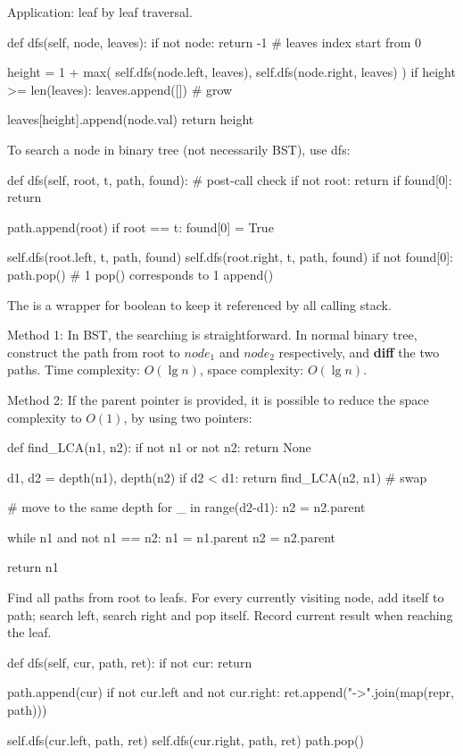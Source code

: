 Application: leaf by leaf traversal. 
\begin{python}
def dfs(self, node, leaves):
    if not node:
        return -1  # leaves index start from 0

    height = 1 + max(
        self.dfs(node.left, leaves), 
        self.dfs(node.right, leaves)
    )
    if height >= len(leaves):
        leaves.append([])  # grow

    leaves[height].append(node.val)
    return height
\end{python}
 To search a node in binary tree (not necessarily BST), use dfs:
\begin{python}
def dfs(self, root, t, path, found):
    # post-call check
    if not root: return        
    if found[0]: return 

    path.append(root)
    if root == t:
        found[0] = True

    self.dfs(root.left, t, path, found)
    self.dfs(root.right, t, path, found)
    if not found[0]:
        path.pop()  # 1 pop() corresponds to 1 append()
\end{python}
The  is a wrapper for boolean to keep it referenced by all calling stack. 

 Method 1: In BST, the searching is straightforward. In normal binary tree, construct the path from root to $node_1$ and $node_2$ respectively, and \textbf{diff} the two paths. Time complexity: $O(\lg n)$, space complexity: $O(\lg n)$. 

Method 2: If the parent pointer is provided, it is possible to reduce the space complexity to $O(1)$, by using two pointers: 
\begin{python}
def find_LCA(n1, n2):
    if not n1 or not n2:
        return None 
        
    d1, d2 = depth(n1), depth(n2)
    if d2 < d1:
        return find_LCA(n2, n1)  # swap
        
    # move to the same depth 
    for _ in range(d2-d1):
        n2 = n2.parent  

    while n1 and not n1 == n2:  
        n1 = n1.parent
        n2 = n2.parent
        
    return n1
\end{python}

 Find all paths from root to leafs. For every currently visiting node, add itself to path; search left, search right and pop itself. Record current result when reaching the leaf.
\begin{python}
def dfs(self, cur, path, ret):
    if not cur: return

    path.append(cur)
    if not cur.left and not cur.right:
        ret.append("->".join(map(repr, path)))

    self.dfs(cur.left, path, ret)
    self.dfs(cur.right, path, ret)
    path.pop()
\end{python}

